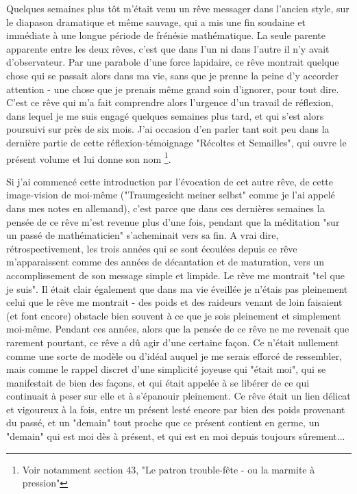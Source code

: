 Quelques semaines plus tôt m'était venu un rêve messager dans l'ancien style, sur le diapason dramatique et même sauvage, qui a mis une fin soudaine et immédiate à une longue période de frénésie mathématique. La seule parente apparente entre les deux rêves, c'est que dans l'un ni dans l'autre il n'y avait d'observateur. Par une parabole d'une force lapidaire, ce rêve montrait quelque chose qui se passait alors dans ma vie, sans que je prenne la peine d'y accorder attention - une chose que je prenais même grand soin d'ignorer, pour tout dire. C'est ce rêve qui m'a fait comprendre alors l'urgence d'un travail de réflexion, dans lequel je me suis engagé quelques semaines plus tard, et qui s'est alors poursuivi sur près de six mois. J'ai occasion d'en parler tant soit peu dans la dernière partie de cette réflexion-témoignage "Récoltes et Semailles", qui ouvre le présent volume et lui donne son nom \footnote{Voir notamment section 43, "Le patron trouble-fête - ou la marmite à pression"}.

Si j'ai commencé cette introduction par l'évocation de cet autre rêve, de cette image-vision de moi-même ("Traumgesicht meiner selbst" comme je l'ai appelé dans mes notes en allemand), c'est parce que dans ces dernières semaines la pensée de ce rêve m'est revenue plus d'une fois, pendant que la méditation "sur un passé de mathématicien" s'acheminait vers sa fin. A vrai dire, rétrospectivement, les trois années qui se sont écoulées depuis ce rêve m'apparaissent comme des années de décantation et de maturation, vers un accomplissement de son message simple et limpide. Le rêve me montrait "tel que je suis". Il était clair également que dans ma vie éveillée je n'étais pas pleinement celui que le rêve me montrait - des poids et des raideurs venant de loin faisaient (et font encore) obstacle bien souvent à ce que je sois pleinement et simplement moi-même. Pendant ces années, alors que la pensée de ce rêve ne me revenait que rarement pourtant, ce rêve a dû agir d'une certaine façon. Ce n'était nullement comme une sorte de modèle ou d'idéal auquel je me serais efforcé de ressembler, mais comme le rappel discret d'une simplicité joyeuse qui "était moi", qui se manifestait de bien des façons, et qui était appelée à se libérer de ce qui continuait à peser sur elle et à s'épanouir pleinement. Ce rêve était un lien délicat et vigoureux à la fois, entre un présent lesté encore par bien des poids provenant du passé, et un "demain" tout proche que ce présent contient en germe, un "demain" qui est moi dès à présent, et qui est en moi depuis toujours sûrement...

